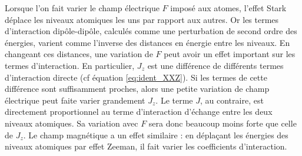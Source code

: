 Lorsque l'on fait varier le champ électrique $F$ imposé aux atomes, l'effet Stark déplace les niveaux atomiques les uns par rapport aux autres.
Or les termes d'interaction dipôle-dipôle, calculés comme une perturbation de second ordre des énergies, varient comme l'inverse des distances en énergie entre les niveaux.
En changeant ces distances, une variation de $F$ peut avoir un effet important sur les termes d'interaction.
En particulier, $J_z$ est une différence de différents termes d'interaction directe (cf équation \eqref{eq:ident_XXZ}).
Si les termes de cette différence sont suffisamment proches, alors une petite variation de champ électrique peut faite varier grandement $J_z$. %
Le terme $J$, au contraire, est directement proportionnel au terme d'interaction d'échange entre les deux niveaux atomiques.
Sa variation avec $F$ sera donc beaucoup moins forte que celle de $J_z$.
Le champ magnétique a un effet similaire : en déplaçant les énergies des niveaux atomiques par effet Zeeman, il fait varier les coefficients d'interaction.

